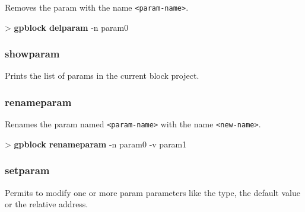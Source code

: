 \documentclass[10pt,a4paper]{article}
\begin{document}
Removes the param with the name \texttt{<param-name>}.\\


\begin{sampletitle}
> \textbf{gpblock delparam} -n param0
\end{sampletitle}


\subsubsection{showparam}
\label{subsec:showparam}

Prints the list of params in the current block project.

\subsubsection{renameparam}
\label{subsec:renameparam}

Renames the param named \texttt{<param-name>} with the name \texttt{<new-name>}.\\


\begin{sampletitle}
> \textbf{gpblock renameparam} -n param0 -v param1
\end{sampletitle}


\subsubsection{setparam}
\label{subsec:setparam}

Permits to modify one or more param parameters like the type, the default value or the relative address.\\
\end{document}
